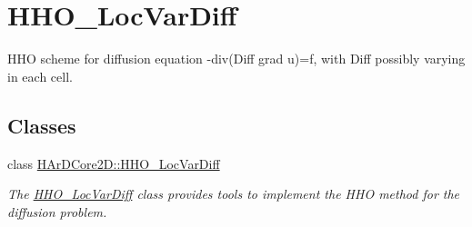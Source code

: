 \hypertarget{group__HHO__LocVarDiff}{}\section{H\+H\+O\+\_\+\+Loc\+Var\+Diff}
\label{group__HHO__LocVarDiff}


H\+HO scheme for diffusion equation -\/div(Diff grad u)=f, with Diff possibly varying in each cell.  


\subsection*{Classes}
\begin{DoxyCompactItemize}
\item 
class \hyperlink{classHArDCore2D_1_1HHO__LocVarDiff}{H\+Ar\+D\+Core2\+D\+::\+H\+H\+O\+\_\+\+Loc\+Var\+Diff}
\begin{DoxyCompactList}\small\item\em The \hyperlink{classHArDCore2D_1_1HHO__LocVarDiff}{H\+H\+O\+\_\+\+Loc\+Var\+Diff} class provides tools to implement the H\+HO method for the diffusion problem. \end{DoxyCompactList}\end{DoxyCompactItemize}
